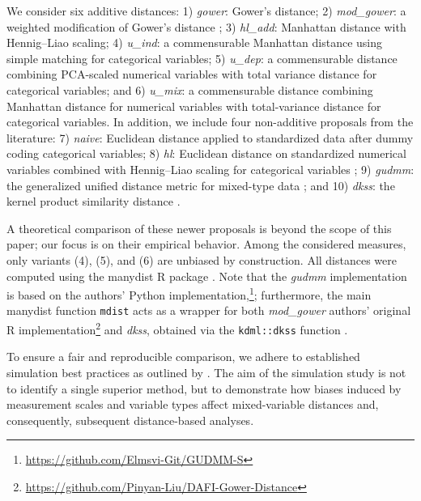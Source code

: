 \documentclass[12pt]{article}
\newcommand{\pkg}[1]{{\normalfont\fontseries{b}\selectfont #1}}
\let\proglang=\textsf
\begin{document}
We consider six additive distances: 1) \emph{gower}: Gower’s distance; 2) \emph{mod\_gower}: a weighted modification of Gower’s distance \parencite{LYNCLP:2024}; 3) \emph{hl\_add}: Manhattan distance with Hennig--Liao scaling; 4) \emph{u\_ind}: a commensurable Manhattan distance using simple matching for categorical variables; 5) \emph{u\_dep}: a commensurable distance combining PCA-scaled numerical variables with total variance distance for categorical variables; and 6) \emph{u\_mix}: a commensurable distance combining Manhattan distance for numerical variables with total-variance distance for categorical variables. In addition, we include four non-additive proposals from the literature: 7) \emph{naive}: Euclidean distance applied to standardized data after dummy coding categorical variables; 8) \emph{hl}: Euclidean distance on standardized numerical variables combined with Hennig--Liao scaling for categorical variables \parencite{HennigLiao2013}; 9) \emph{gudmm}: the generalized unified distance metric for mixed-type data \parencite{MS:2023}; and 10) \emph{dkss}: the kernel product similarity distance \parencite{GT:2024}.

A theoretical comparison of these newer proposals is beyond the scope of this paper; our focus is on their empirical behavior. Among the considered measures, only variants (4), (5), and (6) are unbiased by construction. All distances were computed using the \pkg{manydist} \proglang{R} package \parencite{manydist2026}. Note that the \emph{gudmm} implementation is based on the authors' \proglang{Python} implementation,\footnote{\url{https://github.com/Elmsvi-Git/GUDMM-S}}; furthermore, the main \pkg{manydist} function \texttt{mdist} acts as a wrapper for both \emph{mod\_gower} authors' original \proglang{R} implementation\footnote{\url{https://github.com/Pinyan-Liu/DAFI-Gower-Distance}} and \emph{dkss},  obtained via the \texttt{kdml::dkss} function \parencite{ThompsonGhashti2025}.

To ensure a fair and reproducible comparison, we adhere to established simulation best practices as outlined by \textcite{van2023white}. The aim of the simulation study is not to identify a single superior method, but to demonstrate how biases induced by measurement scales and variable types affect mixed-variable distances and, consequently, subsequent distance-based analyses.
\end{document}
